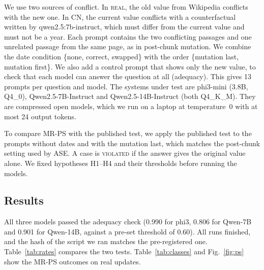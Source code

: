 \documentclass[preprint,12pt,authoryear]{elsarticle}
\newcommand{\cn}{\textsc{CN}}
\newcommand{\mrps}{\textsc{MR-PS}}
\begin{document}
We use two sources of conflict. In \textsc{real}, the old value from Wikipedia conflicts with the new
one. In \cn, the current value conflicts with a counterfactual written by qwen2.5:7b-instruct, which
must differ from the current value and must not be a year. Each prompt contains the two conflicting
passages and one unrelated passage from the same page, as in post-chunk mutation. We combine the date
condition \{none, correct, swapped\} with the order \{mutation last, mutation first\}. We also add a
control prompt that shows only the new value, to check that each model can answer the question at
all (adequacy). This gives 13 prompts per question and model. The systems under test are phi3-mini
(3.8B, Q4\_0), Qwen2.5-7B-Instruct and Qwen2.5-14B-Instruct (both Q4\_K\_M). They are compressed
open models, which we run on a laptop at temperature~0 with at most 24 output tokens.

To compare \mrps{} with the published test, we apply the published test to the prompts without dates
and with the mutation last, which matches the post-chunk setting used by ASE. A case is
\textsc{violated} if the answer gives the original value alone. We fixed hypotheses H1--H4 and their
thresholds before running the models.

\subsection{Results}
All three models passed the adequacy check (0.990 for phi3, 0.806 for Qwen-7B and 0.901 for
Qwen-14B, against a pre-set threshold of 0.60). All runs finished, and the hash of the script we ran
matches the pre-registered one. Table~\ref{tab:rates} compares the two tests. Table~\ref{tab:classes}
and Fig.~\ref{fig:ps} show the \mrps{} outcomes on real updates.
\end{document}
